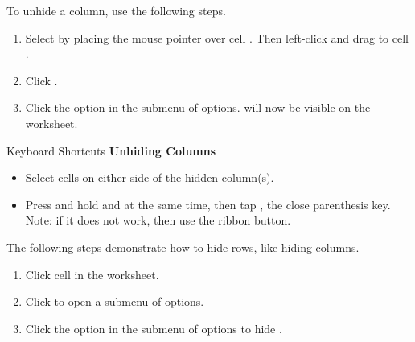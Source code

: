 To unhide a column, use the following steps.

\begin{enumbox}
	\begin{enumerate}
		\item Select  by placing the mouse pointer over cell . Then left-click and drag to cell .
		\item Click . 
		\item Click the  option in the submenu of options.  will now be visible on the worksheet.
	\end{enumerate}
\end{enumbox}

\begin{center}
	\begin{shtcutbox}{Keyboard Shortcuts}
		\textbf{Unhiding Columns}
		\\
		\begin{itemize}
			\setlength{\itemsep}{0pt}
			\setlength{\parskip}{0pt}
			\setlength{\parsep}{0pt}
			
			\item Select cells on either side of the hidden column(s).
			\item Press and hold  and  at the same time, then tap \fmtKeystroke{)}, the close parenthesis key. Note: if it does not work, then use the ribbon button.
			
		\end{itemize}
	\end{shtcutbox}
\end{center}

The following steps demonstrate how to hide rows, like hiding columns.

\begin{enumbox}
	\begin{enumerate}
		\item Click cell  in the  worksheet.
		\item Click  to open a submenu of options.
		\item Click the  option in the submenu of options to hide .
	\end{enumerate}
\end{enumbox}
	
